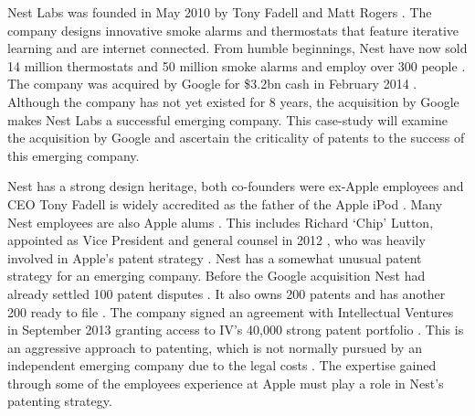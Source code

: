 {}

Nest Labs was founded in May 2010 by Tony Fadell and Matt Rogers \cite{NestFactsheet}.
The company designs innovative smoke alarms and thermostats that feature iterative learning and are internet connected.
From humble beginnings, Nest have now sold 14 million thermostats and 50 million smoke alarms and employ over 300 people \cite{NestFactsheet}.
The company was acquired by Google for \$3.2bn cash \cite{NestReuters} in February 2014 \cite{NestFactsheet}.
Although the company has not yet existed for 8 years, the acquisition by Google makes Nest Labs a successful emerging company.
This case-study will examine the acquisition by Google and ascertain the criticality of patents to the success of this emerging company.

Nest has a strong design heritage, both co-founders were ex-Apple employees and CEO Tony Fadell is widely accredited as the father of the Apple iPod \cite{NestAppleInsider}.
Many Nest employees are also Apple alums \cite{NestReuters}.
This includes Richard `Chip' Lutton, appointed as Vice President and general counsel in 2012 \cite{NestAppleInsider}, who was heavily involved in Apple's patent strategy \cite{NestReuters}.
Nest has a somewhat unusual patent strategy for an emerging company.
Before the Google acquisition Nest had already settled 100 patent disputes \cite{NestCoLabs}.
It also owns 200 patents and has another 200 ready to file \cite{NestCoLabs, NestIV}.
The company signed an agreement with Intellectual Ventures in September 2013 granting access to IV's 40,000 strong patent portfolio \cite{NestIV}.
This is an aggressive approach to patenting, which is not normally pursued by an independent emerging company due to the legal costs \cite{zahra1996technology}.
The expertise gained through some of the employees experience at Apple must play a role in Nest's patenting strategy.


